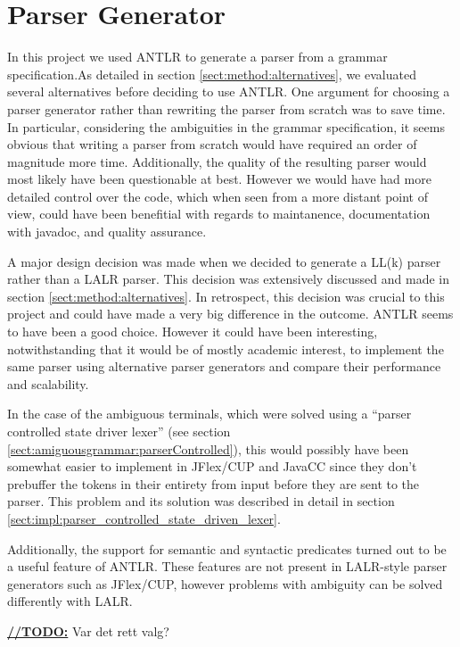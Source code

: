 \section{Parser Generator}
\label{sect:discussion:antlr}
In this project we used ANTLR to generate a parser from a grammar
specification.As detailed in section \ref{sect:method:alternatives}, we
evaluated several alternatives before deciding to use ANTLR. One argument for
choosing a parser generator rather than rewriting the parser from scratch was to
save time. In particular, considering the ambiguities in the grammar
specification, it seems obvious that writing a parser from scratch would
have required an order of magnitude more time. Additionally, the quality of the
resulting parser would most likely have been questionable at best. However
we would have had more detailed control over the code, which when seen from a
more distant point of view, could have been benefitial with regards to
maintanence, documentation with javadoc, and quality assurance.

A major design decision was made when we decided to generate a LL(k) parser rather
than a LALR parser. This decision was extensively discussed and made in
section \ref{sect:method:alternatives}. In retrospect, this decision was
crucial to this project and could have made a very big difference in the
outcome. ANTLR seems to have been a good choice. However it could have been
interesting, notwithstanding that it would be of mostly academic interest, to  
implement the same parser using alternative parser generators and compare their
performance and scalability.

In the case of the ambiguous terminals, which were solved using a ``parser
controlled state driver lexer'' (see section 
\ref{sect:amiguousgrammar:parserControlled}), this would possibly have been
somewhat easier to implement in JFlex/CUP and JavaCC since they don't prebuffer 
the tokens in their entirety from input before they are sent to the parser. This
problem and its solution was described in detail in section
\ref{sect:impl:parser_controlled_state_driven_lexer}.

Additionally, the support for semantic and syntactic predicates turned out to be
a useful feature of ANTLR. These features are not present in LALR-style parser
generators such as JFlex/CUP, however problems with ambiguity can be solved
differently with LALR.

\underline{\textbf{\LARGE //TODO:}} Var det rett valg?
